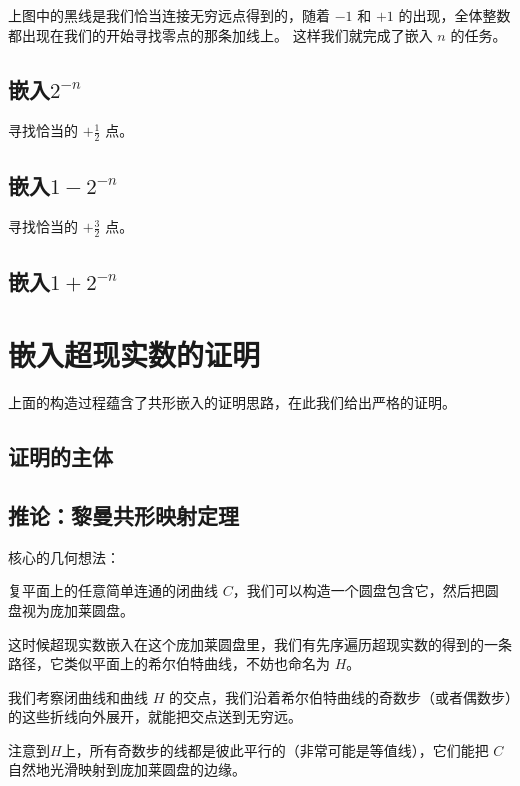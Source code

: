 \documentclass[a4paper,12pt]{article}
\begin{document}
上图中的黑线是我们恰当连接无穷远点得到的，随着 $-1$ 和 $+1$ 的出现，全体整数都出现在我们的开始寻找零点的那条加线上。
这样我们就完成了嵌入 $n$ 的任务。

\newpage

\subsection{嵌入$2^{-n}$}

寻找恰当的 $+\frac{1}{2}$ 点。

\newpage

\subsection{嵌入$1 - 2^{-n}$}

寻找恰当的 $+\frac{3}{2}$ 点。

\newpage

\subsection{嵌入$1 + 2^{-n}$}

\newpage

\section{嵌入超现实数的证明}

上面的构造过程蕴含了共形嵌入的证明思路，在此我们给出严格的证明。

\subsection{证明的主体}

\subsection{推论：黎曼共形映射定理}

核心的几何想法：

复平面上的任意简单连通的闭曲线 $C$，我们可以构造一个圆盘包含它，然后把圆盘视为庞加莱圆盘。

这时候超现实数嵌入在这个庞加莱圆盘里，我们有先序遍历超现实数的得到的一条路径，它类似平面上的希尔伯特曲线，不妨也命名为 $H$。

我们考察闭曲线和曲线 $H$ 的交点，我们沿着希尔伯特曲线的奇数步（或者偶数步）的这些折线向外展开，就能把交点送到无穷远。

注意到$H$上，所有奇数步的线都是彼此平行的（非常可能是等值线），它们能把 $C$ 自然地光滑映射到庞加莱圆盘的边缘。
\end{document}
